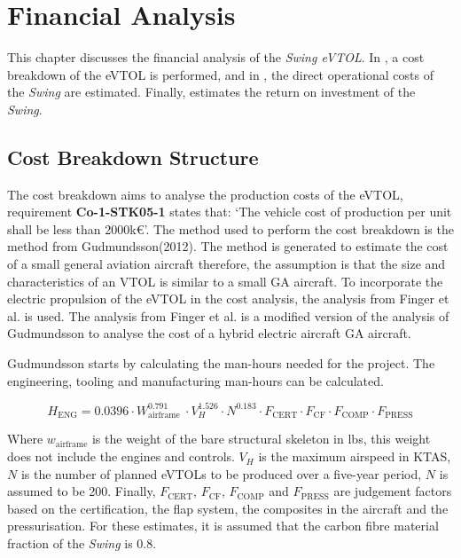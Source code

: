 \chapter{Financial Analysis}
\label{ch:Financial_Analysis}

This chapter discusses the financial analysis of the \textit{Swing eVTOL}.
In , a cost breakdown of the eVTOL is performed,
and in , the direct operational costs of the \textit{Swing} are estimated.
Finally,  estimates the return on investment of the \textit{Swing}.

\section{Cost Breakdown Structure}
\label{sec:Cost_Breakdown_Structure}

The cost breakdown aims to analyse the production costs of the eVTOL, requirement \textbf{Co-1-STK05-1} states that: \enquote*{The vehicle cost of production per unit shall be less than 2000k€}.
The method used to perform the cost breakdown is the method from Gudmundsson\cite{gudmundsson2013general}(2012). The method is generated to estimate the cost of a small general aviation aircraft therefore, the assumption is that the size and characteristics of an VTOL is similar to a small GA aircraft.
To incorporate the electric propulsion of the eVTOL in the cost analysis, the analysis from Finger et al.\cite{finger2019cost_Hybrid_GA_aircraft} is used.
The analysis from Finger et al.
is a modified version of the analysis of Gudmundsson to analyse the cost of a hybrid electric aircraft GA aircraft.

Gudmundsson starts by calculating the man-hours needed for the project. The engineering, tooling and manufacturing man-hours can be calculated.

\begin{equation}
    \label{eq:cost:ManHours_Engineering}
    H_{\text{ENG}}=  0.0396 \cdot W_{\text{airframe }}^{0.791} \cdot V_H^{1.526} \cdot N^{0.183} \cdot F_{\text{CERT}} \cdot F_{\text{CF}} \cdot F_{\text{COMP}} \cdot F_{\text{PRESS}}
\end{equation}

Where $w_{\text{airframe}}$ is the weight of the bare structural skeleton in \unit{lbs}, this weight does not include the engines and controls. $V_H$ is the maximum airspeed in \unit{KTAS}, $N$ is the number of planned eVTOLs to be produced over a five-year period, $N$ is assumed to be 200.
Finally, $F_{\text{CERT}}$, $ F_{\text{CF}}$, $F_{\text{COMP}}$ and $F_{\text{PRESS}}$ are judgement factors based on the certification, the flap system, the composites in the aircraft and the pressurisation.
For these estimates, it is assumed that the carbon fibre material fraction of the \textit{Swing} is 0.8.

